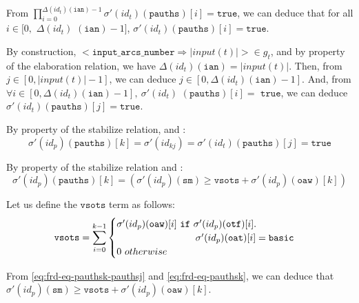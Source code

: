 \documentclass[dvipsnames,12pt]{article}
\begin{document}
\begin{niproof}
\begin{enumerate}
\begin{enumerate}
\begin{enumerate}
        From
        $\prod\limits_{i=0}^{\Delta(id_t)(\texttt{ian})-1}\sigma'(id_t)(\texttt{pauths})[i]=\mathtt{true}$,
        we can deduce that for all $i\in{}[0,$ $\Delta(id_t)$
        $(\texttt{ian})-1]$, $\sigma'(id_t)(\texttt{pauths})[i]=\mathtt{true}$.

        By construction,
        ${<}\mathtt{input\_arcs\_number\Rightarrow}{}\vert{}input(t)\vert{>}\in{}g_t$,
        and by property of the elaboration relation, we have
        $\Delta(id_t)(\texttt{ian})=\vert{}input(t)\vert$. Then, from
        $j\in{}[0,\vert{}input(t)\vert-1]$, we can deduce
        $j\in[0,\Delta(id_t)(\texttt{ian})-1]$. And, from
        $\forall{}i\in{}[0,\Delta(id_t)(\texttt{ian})-1],~\sigma'(id_t)$
        $(\texttt{pauths})[i]=$ $\mathtt{true}$, we can deduce
        $\sigma'(id_t)(\texttt{pauths})[j]=\mathtt{true}$.
        
        By property of the stabilize relation, \InCsCompP{} and
        \InCsCompT{}:
        \begin{equation}
          \label{eq:frd-eq-pauthsk-pauthsj}
          \sigma'(id_p)(\texttt{pauths})[k]=\sigma'(id_{kj})=\sigma'(id_t)(\texttt{pauths})[j]=\mathtt{true}
        \end{equation}

        By property of the stabilize relation and \InCsCompP:
        \begin{equation}
          \label{eq:frd-eq-pauthsk}
          \sigma'(id_p)(\texttt{pauths})[k]=(\sigma'(id_p)(\texttt{sm})\ge{}\mathtt{vsots}+\sigma'(id_p)(\texttt{oaw})[k])
        \end{equation}

        Let us define the $\mathtt{vsots}$ term as follows:
        \begin{equation}
          \label{eq:frd-vsots-snd-case}
          \mathtt{vsots}=\sum\limits_{i=0}^{k-1}
          \begin{cases}
            \sigma'(id_p)(\texttt{oaw})[i]~\mathtt{if}~\sigma'(id_p)(\texttt{otf})[i].\\
            \hspace{19ex}\sigma'(id_p)(\texttt{oat})[i]=\mathtt{basic}\\
            0~otherwise\\
          \end{cases}
        \end{equation}
        
        From \eqref{eq:frd-eq-pauthsk-pauthsj} and
        \eqref{eq:frd-eq-pauthsk}, we can deduce that
        $\sigma'(id_p)(\texttt{sm})\ge{}\mathtt{vsots}+\sigma'(id_p)(\texttt{oaw})[k]$.


\end{enumerate}
\end{enumerate}
\end{enumerate}
\end{niproof}
\end{document}
